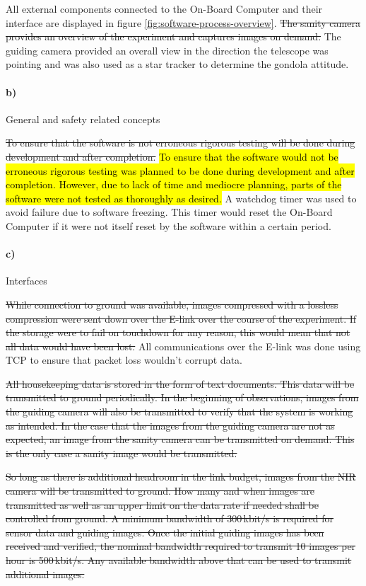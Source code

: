 All external components connected to the On-Board Computer and their interface are displayed in figure \ref{fig:software-process-overview}. \st{The sanity camera provides an overview of the experiment and captures images on demand.} The guiding camera provided an overall view in the direction the telescope was pointing and was also used as a star tracker to determine the gondola attitude.

\paragraph{b)} General and safety related concepts

\st{To ensure that the software is not erroneous rigorous testing will be done during development and after completion.} \hl{To ensure that the software would not be erroneous rigorous testing was planned to be done during development and after completion. However, due to lack of time and mediocre planning, parts of the software were not tested as thoroughly as desired.} A watchdog timer was used to avoid failure due to software freezing. This timer would reset the On-Board Computer if it were not itself reset by the software within a certain period.

\paragraph{c)} Interfaces

\st{While connection to ground was available, images compressed with a lossless compression were sent down over the E-link over the course of the experiment. If the storage were to fail on touchdown for any reason, this would mean that not all data would have been lost.} All communications over the E-link was done using TCP to ensure that packet loss wouldn't corrupt data.



\st{All housekeeping data is stored in the form of text documents. This data will be transmitted to ground periodically. In the beginning of observations, images from the guiding camera will also be transmitted to verify that the system is working as intended. In the case that the images from the guiding camera are not as expected, an image from the sanity camera can be transmitted on demand. This is the only case a sanity image would be transmitted.}

\st{So long as there is additional headroom in the link budget, images from the NIR camera will be transmitted to ground. How many and when images are transmitted as well as an upper limit on the data rate if needed shall be controlled from ground. A minimum bandwidth of 300\,kbit/s is required for sensor data and guiding images. Once the initial guiding images has been received and verified, the nominal bandwidth required to transmit 10 images per hour is 500\,kbit/s. Any available bandwidth above that can be used to transmit additional images.}

